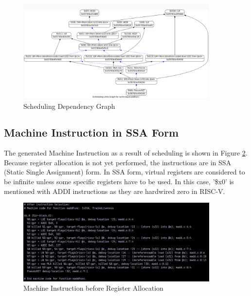 \begin{figure}
    \centering
    \includegraphics[width=0.9\textwidth]{path_instruction/madd_dag_sunit.png}
    \caption{Scheduling Dependency Graph}
    \label{fig:sunit}
\end{figure}


\subsection{Machine Instruction in SSA Form}
The generated Machine Instruction as a result of scheduling is shown in Figure \ref{fig:mc_inst}. Because register allocation is not yet performed, the instructions are in SSA (Static Single Assignment) form. In SSA form, virtual registers are considered to be infinite unless some specific registers have to be used. In this case, '\$x0' is mentioned with ADDI instructions as they are hardwired zero in RISC-V. 

\begin{figure}
    \centering
    \includegraphics[width=0.9\textwidth]{path_instruction/madd_MachineInstruction.png}
    \caption{Machine Instruction before Register Allocation}
    \label{fig:mc_inst}
\end{figure}

\clearpage

